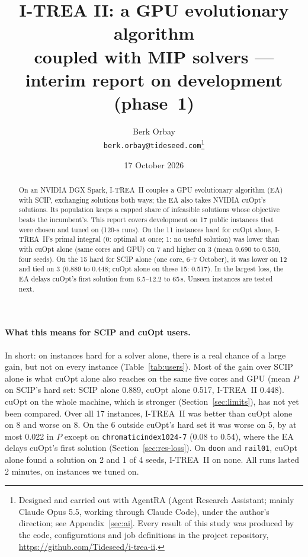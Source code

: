\documentclass[11pt]{article}
\title{I-TREA II: a GPU evolutionary algorithm\\ coupled with MIP solvers ---\\
interim report on development (phase~1)}
\author{Berk Orbay\\ \small\texttt{berk.orbay@tideseed.com}\thanks{Designed and carried out with AgentRA (Agent
Research Assistant; mainly Claude Opus 5.5, working through Claude Code), under the author's direction; see
Appendix~\ref{sec:ai}. Every result of this study was produced by the code, configurations and job definitions in the
project repository, \url{https://github.com/Tideseed/i-trea-ii}.}}
\date{17 October 2026}
\begin{document}
\maketitle

\begin{abstract}
On an NVIDIA DGX Spark, I-TREA~II couples a GPU evolutionary algorithm (EA) with SCIP, exchanging solutions both
ways; the EA also takes NVIDIA cuOpt's solutions. Its population keeps a capped share of infeasible solutions whose
objective beats the incumbent's. This report covers development on 17 public instances that were chosen and
tuned on (120-s runs). On the 11 instances hard for cuOpt alone, I-TREA~II's primal integral (0: optimal at once; 1: no
useful solution) was lower than with cuOpt alone (same cores and GPU) on 7 and higher on 3 (mean 0.690 to 0.550, four
seeds). On the 15 hard for SCIP alone (one core, 6--7 October), it was lower on 12 and tied on 3 (0.889 to 0.448;
cuOpt alone on these 15: 0.517). In the largest loss, the EA delays cuOpt's first solution from 6.5--12.2 to 65\,s.
Unseen instances are tested next.
\end{abstract}

\paragraph{What this means for SCIP and cuOpt users.}
In short: on instances hard for a solver alone, there is a real chance of a large gain, but not on every instance
(Table~\ref{tab:users}). Most of the gain over SCIP alone is what cuOpt alone also reaches on the same five cores and GPU
(mean $P$ on SCIP's hard set: SCIP alone 0.889, cuOpt alone 0.517, I-TREA~II 0.448). cuOpt on the whole machine, which is stronger
(Section~\ref{sec:limits}), has not yet been compared. Over all 17 instances, I-TREA~II was better than cuOpt alone on 8
and worse on 8. On the 6 outside cuOpt's hard set it was worse on 5, by at most 0.022 in $P$ except on
\texttt{chromaticindex1024-7} (0.08 to 0.54), where the EA delays cuOpt's first solution (Section~\ref{sec:res-loss}). On
\texttt{doon} and \texttt{rail01}, cuOpt alone found a solution on 2 and 1 of 4 seeds, I-TREA~II on none. All runs
lasted 2 minutes, on instances we tuned on.
\end{document}
